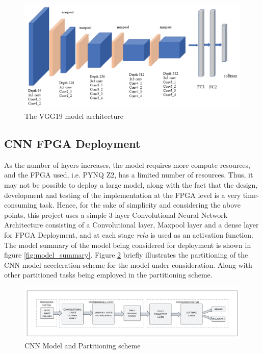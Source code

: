     \begin{figure}[ht]
        \centering
        \includegraphics[width=0.75\linewidth]{images/vgg19.png}
        \caption{The VGG19 model architecture}
        \label{fig:vgg19}
    \end{figure}

    \subsection{CNN FPGA Deployment}
    \noindent
    As the number of layers increases, the model requires more compute resources, and the FPGA used, i.e. PYNQ Z2, has a limited number of resources. Thus, it may not be possible to deploy a large model, along with the fact that the design, development and testing of the implementation at the FPGA level is a very time-consuming task. Hence, for the sake of simplicity and considering the above points, this project uses a simple 3-layer Convolutional Neural Network Architecture consisting of a Convolutional layer, Maxpool layer and a dense layer for FPGA Deployment, and at each stage \textit{relu} is used as an activation function. The model summary of the model being considered for deployment is shown in figure \ref{fig:model_summary}. Figure  \ref{fig:CNNpartition} briefly illustrates the partitioning of the CNN model acceleration scheme for the model under consideration. Along with other partitioned tasks being employed in the partitioning scheme.

    \begin{figure}
        \centering
        \includegraphics[width=1\linewidth]{images/newCNNdiag.png}
        \caption{CNN Model and Partitioning scheme}
        \label{fig:CNNpartition}
    \end{figure}
    
